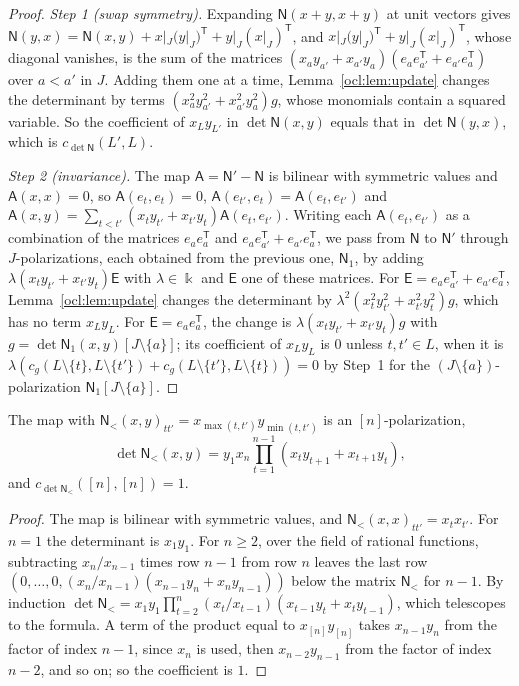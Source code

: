 \begin{proof}
\emph{Step 1 (swap symmetry).} Expanding $\mathsf N(x+y,x+y)$ at unit vectors gives $\mathsf N(y,x)=\mathsf
N(x,y)+x|_J(y|_J)^{\mathsf T}+y|_J(x|_J)^{\mathsf T}$, and $x|_J(y|_J)^{\mathsf T}+y|_J(x|_J)^{\mathsf T}$, whose
diagonal vanishes, is
the sum of the matrices $(x_ay_{a'}+x_{a'}y_a)(e_ae_{a'}^{\mathsf T}+e_{a'}e_a^{\mathsf T})$ over $a<a'$ in $J$. Adding
them one at a time, Lemma~\ref{ocl:lem:update} changes the determinant by terms $(x_a^2y_{a'}^2+x_{a'}^2y_a^2)g$, whose
monomials contain a squared variable. So the coefficient of $x_Ly_{L'}$ in $\det\mathsf N(x,y)$ equals that in
$\det\mathsf N(y,x)$, which is $c_{\det\mathsf N}(L',L)$.

\emph{Step 2 (invariance).} The map $\mathsf A=\mathsf N'-\mathsf N$ is bilinear with symmetric values and $\mathsf
A(x,x)=0$, so $\mathsf A(e_t,e_t)=0$, $\mathsf A(e_{t'},e_t)=\mathsf A(e_t,e_{t'})$ and $\mathsf
A(x,y)=\sum_{t<t'}(x_ty_{t'}+x_{t'}y_t)\mathsf A(e_t,e_{t'})$. Writing each $\mathsf A(e_t,e_{t'})$ as a combination of
the matrices $e_ae_a^{\mathsf T}$ and $e_ae_{a'}^{\mathsf T}+e_{a'}e_a^{\mathsf T}$, we pass from $\mathsf N$ to
$\mathsf N'$ through $J$-polarizations, each obtained from the previous one, $\mathsf N_1$, by adding
$\lambda(x_ty_{t'}+x_{t'}y_t)\mathsf E$ with $\lambda\in\Bbbk$ and $\mathsf E$ one of these matrices. For $\mathsf
E=e_ae_{a'}^{\mathsf T}+e_{a'}e_a^{\mathsf T}$, Lemma~\ref{ocl:lem:update} changes the determinant by
$\lambda^2(x_t^2y_{t'}^2+x_{t'}^2y_t^2)g$, which has no term $x_Ly_L$. For $\mathsf E=e_ae_a^{\mathsf T}$, the change is
$\lambda(x_ty_{t'}+x_{t'}y_t)g$ with $g=\det\mathsf N_1(x,y)[J\setminus\{a\}]$; its coefficient of $x_Ly_L$ is $0$
unless $t,t'\in L$, when it is $\lambda(c_g(L\setminus\{t\},L\setminus\{t'\})+c_g(L\setminus\{t'\},L\setminus\{t\}))=0$
by Step~1 for the $(J\setminus\{a\})$-polarization $\mathsf N_1[J\setminus\{a\}]$.
\end{proof}

\begin{lemma}\label{ocl:lem:reference}
The map with $\mathsf N_<(x,y)_{tt'}=x_{\max(t,t')}y_{\min(t,t')}$ is an $[n]$-polarization,
\[
 \det\mathsf N_<(x,y)=y_1x_n\prod_{t=1}^{n-1}(x_ty_{t+1}+x_{t+1}y_t),
\]
and $c_{\det\mathsf N_<}([n],[n])=1$.
\end{lemma}

\begin{proof}
The map is bilinear with symmetric values, and $\mathsf N_<(x,x)_{tt'}=x_tx_{t'}$. For $n=1$ the determinant is
$x_1y_1$. For $n\ge2$, over the field of rational functions, subtracting $x_n/x_{n-1}$ times row $n-1$ from row $n$
leaves the last row $(0,\dots,0,(x_n/x_{n-1})(x_{n-1}y_n+x_ny_{n-1}))$ below the matrix $\mathsf N_<$ for $n-1$. By
induction $\det\mathsf N_<=x_1y_1\prod_{t=2}^n(x_t/x_{t-1})(x_{t-1}y_t+x_ty_{t-1})$, which telescopes
to the formula. A term of the product equal to $x_{[n]}y_{[n]}$ takes $x_{n-1}y_n$ from the factor of index $n-1$, since
$x_n$ is used, then $x_{n-2}y_{n-1}$ from the factor of index $n-2$, and so on; so the coefficient is $1$.
\end{proof}

